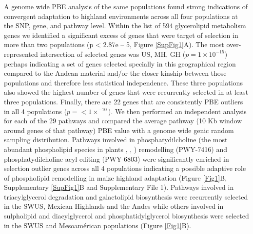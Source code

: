 \documentclass[9pt,twocolumn,twoside]{BioRxiv}
\begin{document}
A genome wide PBE analysis of the same populations \cite{Wang2020-mp} found strong indications of convergent adaptation to highland environments across all four populations at the SNP, gene, and pathway level.
Within the list of 594 glycerolipid metabolism genes we identified a significant excess of genes that were target of selection in more than two populations (p < 2.87e – 5, Figure \ref{SupFig1}A).  
The most over-represented intersection of selected genes was US, MH, GH ($p = 1  \times 10 ^{-15} $) perhaps indicating a set of genes selected specially in this geographical region compared to the Andean material and/or the closer kinship between those populations and therefore less statistical independence. 
These three populations also showed the highest number of genes that were recurrently selected in at least three populations.
Finally, there are 22 genes that are consistently PBE outliers in all 4 populations ($p =<1  \times  ^{-10}$). 
We then performed an independent analysis for each of the 29 pathways and compared the average pathway (10 Kb window around genes of that pathway) PBE value with a genome wide genic random sampling distribution. 
Pathways involved in phosphatydilcholine (the most abundant phospholipid species in plants \citep{Gu2017-nd}, \citep{Poincelot1976-qe}, \citep{Hawke1974-ab}) remodelling (PWY-7416) and phosphatydilcholine acyl editing (PWY-6803) were significantly enriched in selection outlier genes across all 4 populations indicating a possible adaptive role of phospholipid remodelling in maize highland adaptation (Figure \ref{Fig1}B, Supplementary \ref{SupFig1}B and Supplementary File 1). 
Pathways involved in triacylglycerol degradation and galactolipid biosynthesis were recurrently selected in the SWUS, Mexican Highlands and the Andes while others involved in sulpholipid and diacylglycerol and phosphatidylglycerol biosynthesis were selected in the SWUS and Mesoamérican populations (Figure \ref{Fig1}B).  
\end{document}
